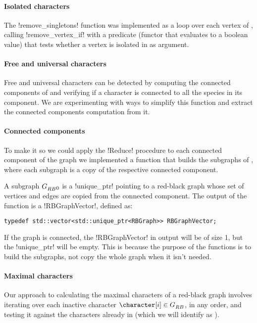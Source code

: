 \paragraph{Isolated characters}

The !remove_singletons! function was implemented as a loop over each vertex of \grb{}, calling !remove_vertex_if! with a predicate (functor that evaluates to a boolean value) that tests whether a vertex is isolated in \grb{} as argument.

\paragraph{Free and universal characters}

Free and universal characters can be detected by computing the connected components of \grb{} and verifying if a character is connected to all the species in its component.
We are experimenting with ways to simplify this function and extract the connected components computation from it.

\paragraph{Connected components}

To make it so we could apply the !Reduce! procedure to each connected component of the graph we implemented a function that builds the subgraphs of \grb{}, where each subgraph is a copy of the respective connected component.

A subgraph $G_{RB}^{}{}_{0}$ is a !unique_ptr! pointing to a red-black graph whose set of vertices and edges are copied from the  connected component.
The output of the function is a !RBGraphVector!, defined as:

\begin{lstlisting}[moreemph={RBGraph}]
  typedef std::vector<std::unique_ptr<RBGraph>> RBGraphVector;
\end{lstlisting}

If the graph \grb{} is connected, the !RBGraphVector! in output will be of size 1, but the !unique_ptr! will be empty.
This is because the purpose of the functions is to build the subgraphs, not copy the whole graph when it isn't needed.

\paragraph{Maximal characters}

Our approach to calculating the maximal characters of a red-black graph involves iterating over each inactive character $\character[i] \in \grb{}$, in any order, and testing it against the characters already in \cm{} (which we will identify as \character[j]).


